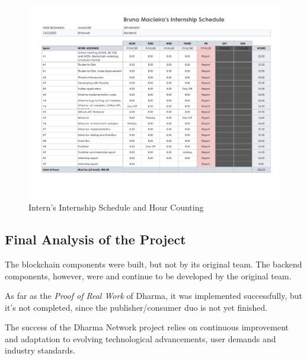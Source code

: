 \begin{figure}[htbp]
	\centering
	\includegraphics[scale=0.5]{figures/Work_Hours - Work Schedule.pdf}  %
	\caption{Intern's Internship Schedule and Hour Counting}
	\label{sch}
\end{figure}

\subsection{Final Analysis of the Project}

The blockchain components were built, but not by its original team. The backend components, however, were and continue to be developed by the original team.\newline

As far as the \textit{Proof of Real Work} of Dharma, it was implemented successfully, but it's not completed, since the publisher/consumer duo is not yet finished.\newline

The success of the Dharma Network project relies on continuous improvement and adaptation to evolving technological advancements, user demands and industry standards.